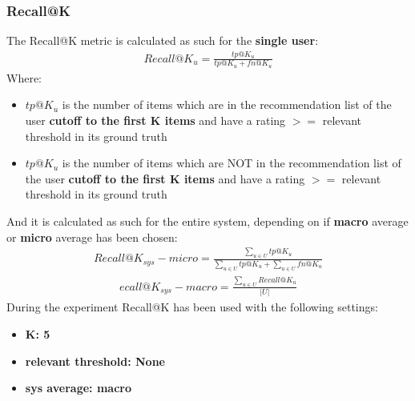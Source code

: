 \documentclass[11pt]{article}
\begin{document}
\subsubsection{Recall@K}\label{subsubsec:rec-k}
The Recall@K metric is calculated as such for the \textbf{single user}:
\hfill\break
\hfill\break
    \[
       \begin{gathered}
           Recall@K_u = \frac{tp@K_u}{tp@K_u + fn@K_u}
       \end{gathered}
    \]
\hfill\break
\hfill\break
    Where:
\begin{itemize}
    \item $tp@K_u$ is the number of items which are in the recommendation list of the user
      \textbf{cutoff to the first K items} and have a rating $>=$ relevant threshold in its ground truth
    \item $tp@K_u$ is the number of items which are NOT in the recommendation list of the user
      \textbf{cutoff to the first K items} and have a rating $>=$ relevant threshold in its ground truth
\end{itemize}
\hfill\break
\hfill\break
And it is calculated as such for the entire system, depending on if \textbf{macro} average or \textbf{micro} average
has been chosen:
\hfill\break
\hfill\break
    \[
       \begin{gathered}
           Recall@K_{sys} - micro = \frac{\sum_{u \in U} tp@K_u}{\sum_{u \in U} tp@K_u + \sum_{u \in U} fn@K_u}
       \end{gathered}
    \]
\hfill\break
\hfill\break
    \[
      \begin{gathered}
          ecall@K_{sys} - macro = \frac{\sum_{u \in U} Recall@K_u}{|U|}
      \end{gathered}
    \]
\hfill\break
\hfill\break
During the experiment Recall@K has been used with the following settings:
\begin{itemize}
    \item \textbf{K: 5 }
    \item \textbf{relevant threshold: None }
    \item \textbf{sys average: macro }
\end{itemize}
\hfill\break
\hfill\break

\end{document}
